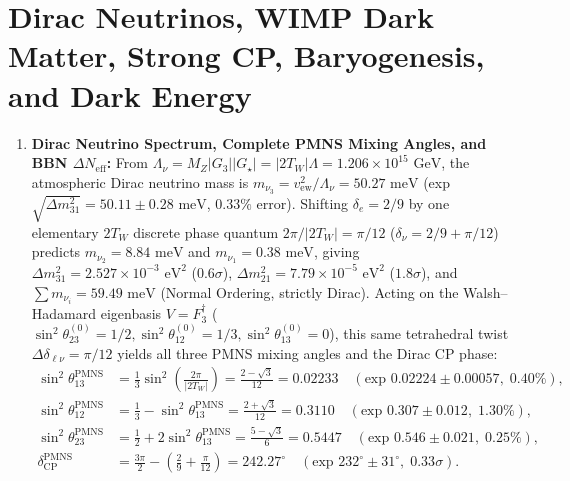 \documentclass[11pt,a4paper]{article}
\theoremstyle{definition}
\theoremstyle{remark}
\newcommand{\Gthree}{G_3}
\newcommand{\Gstar}{G_\star}
\begin{document}
\section{Dirac Neutrinos, WIMP Dark Matter, Strong CP, Baryogenesis, and Dark Energy}

\begin{enumerate}
    \item \textbf{Dirac Neutrino Spectrum, Complete PMNS Mixing Angles, and BBN $\Delta N_{\mathrm{eff}}$:} From $\Lambda_\nu = M_Z |\Gthree| |\Gstar| = |2T_W|\Lambda = 1.206 \times 10^{15}\text{ GeV}$, the atmospheric Dirac neutrino mass is $m_{\nu_3} = v_{\mathrm{ew}}^2 / \Lambda_\nu = 50.27\text{ meV}$ (exp $\sqrt{\Delta m_{31}^2} = 50.11 \pm 0.28\text{ meV}$, $0.33\%$ error). Shifting $\delta_e = 2/9$ by one elementary $2T_W$ discrete phase quantum $2\pi / |2T_W| = \pi/12$ ($\delta_\nu = 2/9 + \pi/12$) predicts $m_{\nu_2} = 8.84\text{ meV}$ and $m_{\nu_1} = 0.38\text{ meV}$, giving $\Delta m_{31}^2 = 2.527 \times 10^{-3}\text{ eV}^2$ ($0.6\sigma$), $\Delta m_{21}^2 = 7.79 \times 10^{-5}\text{ eV}^2$ ($1.8\sigma$), and $\sum m_{\nu_i} = 59.49\text{ meV}$ (Normal Ordering, strictly Dirac). Acting on the Walsh--Hadamard eigenbasis $V = F_3^\dagger$ ($\sin^2\theta_{23}^{(0)} = 1/2, \sin^2\theta_{12}^{(0)} = 1/3, \sin^2\theta_{13}^{(0)} = 0$), this same tetrahedral twist $\Delta\delta_{\ell\nu} = \pi/12$ yields all three PMNS mixing angles and the Dirac CP phase:
    \begin{equation}
    \label{eq:pmns_angles}
    \begin{aligned}
    \sin^2\theta_{13}^{\mathrm{PMNS}} &= \frac{1}{3}\sin^2\!\left(\frac{2\pi}{|2T_W|}\right) = \frac{2-\sqrt{3}}{12} = 0.02233 \quad (\text{exp } 0.02224 \pm 0.00057,\; 0.40\%), \\
    \sin^2\theta_{12}^{\mathrm{PMNS}} &= \frac{1}{3} - \sin^2\theta_{13}^{\mathrm{PMNS}} = \frac{2+\sqrt{3}}{12} = 0.3110 \quad (\text{exp } 0.307 \pm 0.012,\; 1.30\%), \\
    \sin^2\theta_{23}^{\mathrm{PMNS}} &= \frac{1}{2} + 2\sin^2\theta_{13}^{\mathrm{PMNS}} = \frac{5-\sqrt{3}}{6} = 0.5447 \quad (\text{exp } 0.546 \pm 0.021,\; 0.25\%), \\
    \delta_{\mathrm{CP}}^{\mathrm{PMNS}} &= \frac{3\pi}{2} - \left(\frac{2}{9} + \frac{\pi}{12}\right) = 242.27^\circ \quad (\text{exp } 232^\circ \pm 31^\circ,\; 0.33\sigma).
    \end{aligned}

\end{equation}
\end{enumerate}
\end{document}
